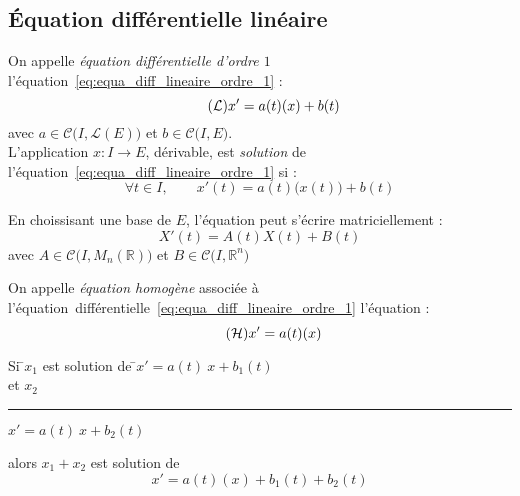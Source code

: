 \documentclass[11pt,a4paper,fleqn,pdftex]{report}
\begin{document}
\subsection{Équation différentielle linéaire} %
\label{sub:equa_diff_lineaire}

\begin{dfn}
     On appelle \emph{équation différentielle d'ordre $1$} l'équation~\eqref{eq:equa_diff_lineaire_ordre_1} :
     \begin{equation}\tag{\ensuremath{\mathcal{L}}}\label{eq:equa_diff_lineaire_ordre_1}
     x' = a(t)(x) +b(t)
     \end{equation}
     avec $a\in \mathcal{C}\big( I,\mathscr{L}(E)\big)$ et $b\in \mathcal{C}\big( I,E\big)$.\\
     L'application $x : I\to E$, dérivable, est \emph{solution} de l'équation~\eqref{eq:equa_diff_lineaire_ordre_1} si : 
     \begin{equation}
     \forall t\in I,\qquad x'(t) = a(t)\Big( x(t)\Big) +b(t)
     \end{equation}
\end{dfn}
%
\begin{dfn}
     En choissisant une base de $E$, l'équation peut s'écrire matriciellement :
     \begin{equation}
     X'(t)=A(t)X(t)+B(t)
     \end{equation}
     avec $A\in \mathcal{C}\Big( I,M_n (\mathbb{R})\Big) $ et $B \in \mathcal{C}\big( I,\mathbb{R}^n\big) $
\end{dfn}
\begin{dfn}
     On appelle \emph{équation homogène} associée à l'équation~différentielle~\eqref{eq:equa_diff_lineaire_ordre_1} l'équation : 
     \begin{equation}\tag{\ensuremath{\mathcal{H}}}\label{eq:equa_diff_homogene_ordre_1}
     x'=a(t)(x)
     \end{equation}
\end{dfn}
\begin{theorem}
     \begin{tabbing}
          Si \=$x_1$ est solution de \=$x'=a(t)~x+b_1(t)$\\
          et \>$x_2$ \rule{6em}{0.4pt} \>$x'=a(t)~x+b_2(t)$
     \end{tabbing}
     alors $x_1+x_2$ est solution de 
     \begin{equation}
     x' = a(t)(x) + b_1(t) + b_2(t)
     \end{equation}
\end{theorem}
\end{document}
